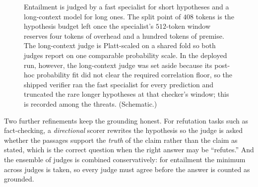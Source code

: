 \begin{figure}[htbp]
\centering
{}
\caption[The length-dispatched NLI judges]{Entailment is judged by a fast specialist
for short hypotheses and a long-context model for long ones. The split point of
$408$ tokens is the hypothesis budget left once the specialist's $512$-token window
reserves four tokens of overhead and a hundred tokens of premise. The long-context
judge is Platt-scaled on a shared fold so both judges report on one comparable
probability scale. In the deployed run, however, the long-context judge was set aside
because its post-hoc probability fit did not clear the required correlation floor, so
the shipped verifier ran the fast specialist for every prediction and truncated the
rare longer hypotheses at that checker's window; this is recorded among the threats. (Schematic.)}
\label{fig:nli-dispatch}
\end{figure}

Two further refinements keep the grounding honest. For refutation tasks such as
fact-checking, a \emph{directional} scorer rewrites the hypothesis so the judge is
asked whether the passages support the \emph{truth} of the claim rather than the
claim as stated, which is the correct question when the right answer may be
``refutes.'' And the ensemble of judges is combined conservatively: for entailment
the minimum across judges is taken, so every judge must agree before the answer is
counted as grounded.

